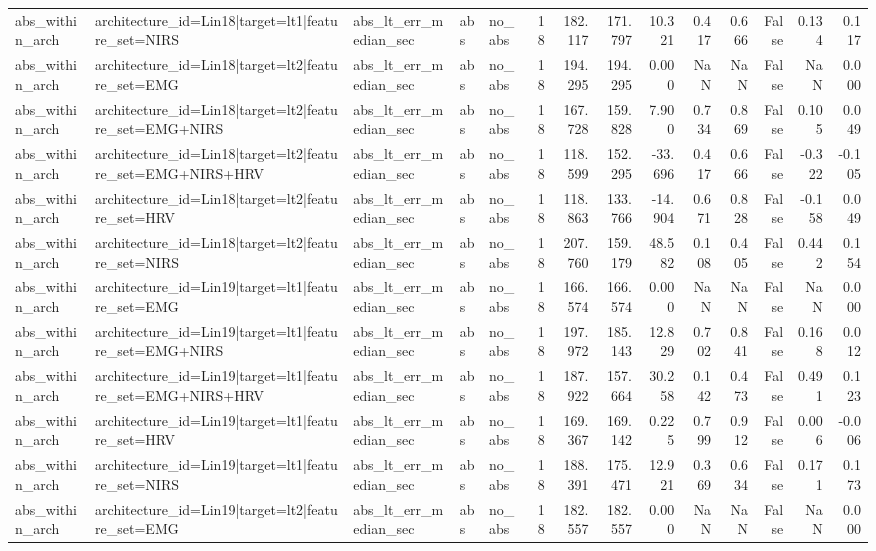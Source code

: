 \begin{table}
\begin{tabular}{lllllrrrrrrrrr}
abs_within_arch & architecture_id=Lin18|target=lt1|feature_set=NIRS & abs_lt_err_median_sec & abs & no_abs & 18 & 182.117 & 171.797 & 10.321 & 0.417 & 0.666 & False & 0.134 & 0.117 \\
abs_within_arch & architecture_id=Lin18|target=lt2|feature_set=EMG & abs_lt_err_median_sec & abs & no_abs & 18 & 194.295 & 194.295 & 0.000 & NaN & NaN & False & NaN & 0.000 \\
abs_within_arch & architecture_id=Lin18|target=lt2|feature_set=EMG+NIRS & abs_lt_err_median_sec & abs & no_abs & 18 & 167.728 & 159.828 & 7.900 & 0.734 & 0.869 & False & 0.105 & 0.049 \\
abs_within_arch & architecture_id=Lin18|target=lt2|feature_set=EMG+NIRS+HRV & abs_lt_err_median_sec & abs & no_abs & 18 & 118.599 & 152.295 & -33.696 & 0.417 & 0.666 & False & -0.322 & -0.105 \\
abs_within_arch & architecture_id=Lin18|target=lt2|feature_set=HRV & abs_lt_err_median_sec & abs & no_abs & 18 & 118.863 & 133.766 & -14.904 & 0.671 & 0.828 & False & -0.158 & 0.049 \\
abs_within_arch & architecture_id=Lin18|target=lt2|feature_set=NIRS & abs_lt_err_median_sec & abs & no_abs & 18 & 207.760 & 159.179 & 48.582 & 0.108 & 0.405 & False & 0.442 & 0.154 \\
abs_within_arch & architecture_id=Lin19|target=lt1|feature_set=EMG & abs_lt_err_median_sec & abs & no_abs & 18 & 166.574 & 166.574 & 0.000 & NaN & NaN & False & NaN & 0.000 \\
abs_within_arch & architecture_id=Lin19|target=lt1|feature_set=EMG+NIRS & abs_lt_err_median_sec & abs & no_abs & 18 & 197.972 & 185.143 & 12.829 & 0.702 & 0.841 & False & 0.168 & 0.012 \\
abs_within_arch & architecture_id=Lin19|target=lt1|feature_set=EMG+NIRS+HRV & abs_lt_err_median_sec & abs & no_abs & 18 & 187.922 & 157.664 & 30.258 & 0.142 & 0.473 & False & 0.491 & 0.123 \\
abs_within_arch & architecture_id=Lin19|target=lt1|feature_set=HRV & abs_lt_err_median_sec & abs & no_abs & 18 & 169.367 & 169.142 & 0.225 & 0.799 & 0.912 & False & 0.006 & -0.006 \\
abs_within_arch & architecture_id=Lin19|target=lt1|feature_set=NIRS & abs_lt_err_median_sec & abs & no_abs & 18 & 188.391 & 175.471 & 12.921 & 0.369 & 0.634 & False & 0.171 & 0.173 \\
abs_within_arch & architecture_id=Lin19|target=lt2|feature_set=EMG & abs_lt_err_median_sec & abs & no_abs & 18 & 182.557 & 182.557 & 0.000 & NaN & NaN & False & NaN & 0.000 \\

\end{tabular}
\end{table}

